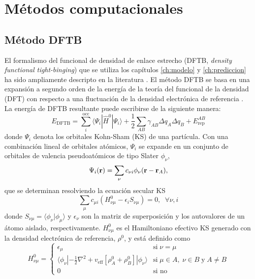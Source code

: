 \section{Métodos computacionales}

\subsection{Método DFTB}\label{s:dftb}

El formalismo del funcional de densidad de enlace estrecho (DFTB, \textit{density
functional tight-binging}) que se utiliza los capítulos \ref{ch:modelo} y 
\ref{ch:prediccion} ha sido ampliamente descripto en la literatura 
\cite{elstner1998,frauenheim2000,seifert2007,gaus2011}. El método DFTB se basa 
en una expansión a segundo orden de la energía de la teoría del funcional de la 
densidad (DFT) con respecto a una fluctuación de la densidad electrónica de 
referencia \cite{foulkes1989}. La energía de DFTB resultante puede escribirse de 
la siguiente manera:
\begin{equation}\label{eq:dftb}
    E_{\text{DFTB}}=\sum_i^{\text{occ}}\langle\Psi_i|\hat{H}^0|\Psi_i\rangle+\frac{1}{2}\sum_{AB}\gamma_{AB}\Delta q_A\Delta q_B+E_{\text{rep}}^{AB}
\end{equation}
donde $\Psi_i$ denota los orbitales Kohn-Sham (KS) de una partícula. Con una 
combinación lineal de orbitales atómicos, $\Psi_i$ se expande en un conjunto de 
orbitales de valencia pseudoatómicos de tipo Slater $\phi_\nu$,
\begin{equation}
    \Psi_i({\bf r})=\sum_\nu c_{\nu i}\phi_\nu({\bf r}-{\bf r}_A),
\end{equation}
que se determinan resolviendo la ecuación secular KS
\begin{equation}\label{eq:ks}
    \sum_\mu c_{\mu i}\left(H^0_{\nu\mu}-\epsilon_iS_{\nu\mu}\right)=0, \;\;\forall \nu,i
\end{equation}
donde $S_{\nu\mu}=\langle \phi_\nu| \phi_\mu\rangle$ y $\epsilon_\nu$ son la 
matriz de superposición y los autovalores de un átomo aislado, respectivamente.
${H}^0_{\nu\mu}$ es el Hamiltoniano efectivo KS generado con la densidad 
electrónica de referencia, $\rho^0$, y está definido como
\begin{equation}\label{eq:h0}
    H^0_{\nu\mu}=\begin{cases}
        \epsilon_\mu & \text{si}\; \nu=\mu\\
        \langle \phi_{\nu}| -\frac{1}{2}\nabla^2+v_{\text{eff}}\left[\rho_A^0+\rho_B^0\right]|\phi_{\nu}\rangle&\text{si}\;\mu\in A,\; \nu\in B\;\text{y} \;A\ne B\\
        0& \text{si no}
    \end{cases}
\end{equation}
